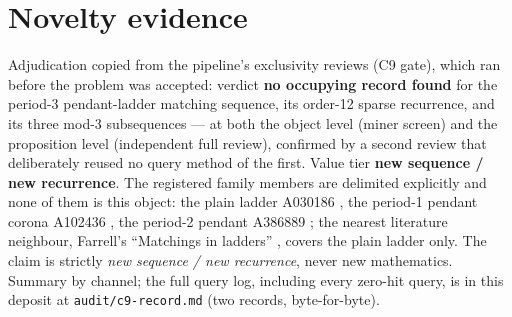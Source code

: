 \documentclass[11pt]{article}
\begin{document}
\section{Novelty evidence}\label{sec:novelty}

Adjudication copied from the pipeline's exclusivity reviews (C9 gate), which
ran before the problem was accepted: verdict \textbf{no occupying record
found} for the period-3 pendant-ladder matching sequence, its order-12
sparse recurrence, and its three mod-3 subsequences --- at both the object
level (miner screen) and the proposition level (independent full review),
confirmed by a second review that deliberately reused no query method of the
first. Value tier \textbf{new sequence / new recurrence}. The registered
family members are delimited explicitly and none of them is this object:
the plain ladder A030186 \cite{a030186}, the period-1 pendant corona
A102436 \cite{a102436}, the period-2 pendant A386889 \cite{a386889}; the
nearest literature neighbour, Farrell's ``Matchings in ladders''
\cite{farrell1978}, covers the plain ladder only. The claim is strictly
\emph{new sequence / new recurrence}, never new mathematics. Summary by
channel; the full query log, including every zero-hit query, is in this
deposit at \texttt{audit/c9-record.md} (two records, byte-for-byte).
\end{document}
